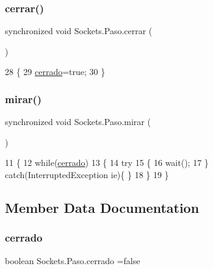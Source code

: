 \subsubsection{\texorpdfstring{cerrar()}{cerrar()}}
{\footnotesize\ttfamily synchronized void Sockets.\+Paso.\+cerrar (\begin{DoxyParamCaption}{ }\end{DoxyParamCaption})\hspace{0.3cm}{\ttfamily [inline]}}


\begin{DoxyCode}
28     \{
29         \mbox{\hyperlink{class_sockets_1_1_paso_adef5c84c1b38cd3d8d85e20b7aa5babe}{cerrado}}=\textcolor{keyword}{true};
30     \}
\end{DoxyCode}
\mbox{\label{class_sockets_1_1_paso_a56cd4d4d8e714895b6cc7692223d303c}} 
\subsubsection{\texorpdfstring{mirar()}{mirar()}}
{\footnotesize\ttfamily synchronized void Sockets.\+Paso.\+mirar (\begin{DoxyParamCaption}{ }\end{DoxyParamCaption})\hspace{0.3cm}{\ttfamily [inline]}}


\begin{DoxyCode}
11     \{
12         \textcolor{keywordflow}{while}(\mbox{\hyperlink{class_sockets_1_1_paso_adef5c84c1b38cd3d8d85e20b7aa5babe}{cerrado}})
13         \{
14             \textcolor{keywordflow}{try}
15             \{
16                 wait();
17             \} \textcolor{keywordflow}{catch}(InterruptedException ie)\{ \}
18         \}
19     \}
\end{DoxyCode}


\subsection{Member Data Documentation}
\mbox{\label{class_sockets_1_1_paso_adef5c84c1b38cd3d8d85e20b7aa5babe}} 
\subsubsection{\texorpdfstring{cerrado}{cerrado}}
{\footnotesize\ttfamily boolean Sockets.\+Paso.\+cerrado =false\hspace{0.3cm}{\ttfamily [private]}}

